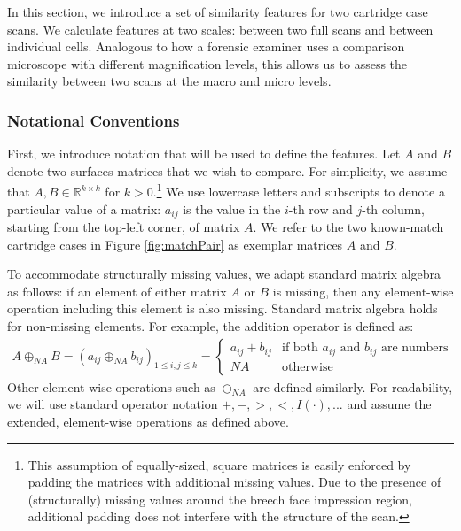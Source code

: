 \documentclass[11pt,]{isuthesis}
\let\rmarkdownfootnote\footnote%
\def\footnote{\protect\rmarkdownfootnote}
\begin{document}
In this section, we introduce a set of similarity features for two cartridge case scans.
We calculate features at two scales: between two full scans and between individual cells.
Analogous to how a forensic examiner uses a comparison microscope with different magnification levels, this allows us to assess the similarity between two scans at the macro and micro levels.

\hypertarget{notational-conventions}{%
\subsubsection{Notational Conventions}\label{notational-conventions}}

First, we introduce notation that will be used to define the features.
Let \(A\) and \(B\) denote two surfaces matrices that we wish to compare.
For simplicity, we assume that \(A,B \in \mathbb{R}^{k \times k}\) for \(k > 0\).\footnote{This assumption of equally-sized, square matrices is easily enforced by padding the matrices with additional missing values.
Due to the presence of (structurally) missing values around the breech face impression region, additional padding does not interfere with the structure of the scan.}
We use lowercase letters and subscripts to denote a particular value of a matrix: \(a_{ij}\) is the value in the \(i\)-th row and \(j\)-th column, starting from the top-left corner, of matrix \(A\).
We refer to the two known-match cartridge cases in Figure \ref{fig:matchPair} as exemplar matrices \(A\) and \(B\).

To accommodate structurally missing values, we adapt standard matrix algebra as follows: if an element of either matrix \(A\) or \(B\) is missing, then any element-wise operation including this element is also missing.
Standard matrix algebra holds for non-missing elements.
For example, the addition operator is defined as:
\begin{align*}
A \oplus_{NA} B = (a_{ij} \oplus_{NA} b_{ij})_{1 \leq i,j \leq k} = 
\begin{cases}
a_{ij} + b_{ij} & \text{if both $a_{ij}$ and $b_{ij}$ are numbers} \\
NA &\text{otherwise}
\end{cases}
\end{align*}
Other element-wise operations such as \(\ominus_{NA}\) are defined similarly.
For readability, we will use standard operator notation \(+, -, >, <, I(\cdot), ...\) and assume the extended, element-wise operations as defined above.
\end{document}
